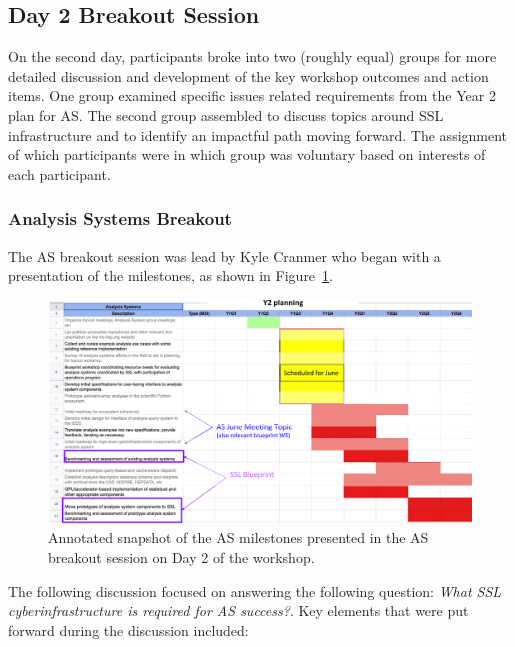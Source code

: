 \documentclass[11pt,letterpaper,fleqn]{article}
\begin{document}
\subsection{Day 2 Breakout Session}
\vspace{0.2cm}
On the second day, participants broke into two (roughly equal) groups for more detailed discussion and development of the key workshop outcomes and action items. One group examined specific issues related requirements from the Year 2 plan for AS. The second group assembled to discuss topics around SSL infrastructure and to identify an impactful path moving forward. The assignment of which participants were in which group was voluntary based on interests of each participant.

\subsubsection{Analysis Systems Breakout}
\vspace{0.2cm}
The AS breakout session was lead by Kyle Cranmer who began with a presentation of the milestones, as shown in Figure~\ref{fig:AS_milestones}.
\begin{figure}
  \includegraphics[width=\linewidth]{figures/as_milestones.png}
  \caption{Annotated snapshot of the AS milestones presented in the AS breakout session on Day 2 of the workshop.}
  \label{fig:AS_milestones}
\end{figure}
The following discussion focused on answering the following question: {\it What SSL cyberinfrastructure is required for AS success?}. Key elements that were put forward during the discussion included:
\end{document}
